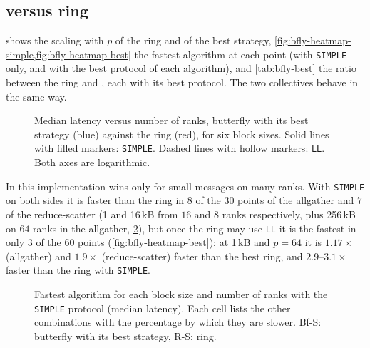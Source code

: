\subsection{\bine{} versus ring}\label{sec:bfly-res-ring}

 shows the scaling with $p$ of the ring and of the best \bine{} strategy, \cref{fig:bfly-heatmap-simple,fig:bfly-heatmap-best} the fastest algorithm at each point (with \texttt{SIMPLE} only, and with the best protocol of each algorithm), and \cref{tab:bfly-best} the ratio between the ring and \bine{}, each with its best protocol.
The two collectives behave in the same way.

\begin{figure}[!tbp]
  \caption{Median latency versus number of ranks, \bine{} butterfly with its best strategy (blue) against the \nccl{} ring (red), for six block sizes. Solid lines with filled markers: \texttt{SIMPLE}. Dashed lines with hollow markers: \texttt{LL}. Both axes are logarithmic.}
  \label{fig:bfly-scaling}
\end{figure}

In this implementation \bine{} wins only for small messages on many ranks.
With \texttt{SIMPLE} on both sides it is faster than the ring in $8$ of the $30$ points of the allgather and $7$ of the reduce-scatter (1 and 16\,kB from $16$ and $8$ ranks respectively, plus 256\,kB on $64$ ranks in the allgather, \cref{fig:bfly-heatmap-simple}), but once the ring may use \texttt{LL} it is the fastest in only $3$ of the $60$ points (\cref{fig:bfly-heatmap-best}): at 1\,kB and $p=64$ it is $1.17\times$ (allgather) and $1.9\times$ (reduce-scatter) faster than the best ring, and $2.9$--$3.1\times$ faster than the ring with \texttt{SIMPLE}.

\begin{figure}[!tbp]
  \caption{Fastest algorithm for each block size and number of ranks with the \texttt{SIMPLE} protocol (median latency). Each cell lists the other combinations with the percentage by which they are slower. Bf-S: \bine{} butterfly with its best strategy, R-S: \nccl{} ring.}
  \label{fig:bfly-heatmap-simple}
\end{figure}

